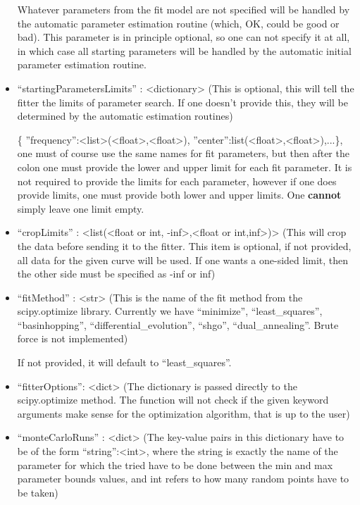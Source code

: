 \documentclass[11pt]{article} %
\begin{document}
\begin{tcolorbox}[breakable,title=Sending ``params'' to the server]
\begin{itemize}
Whatever parameters from the fit model are not specified will be handled 
by the automatic parameter estimation routine (which, OK, could be good or bad). This parameter is in principle optional, so one can not specify it at all, in which case all starting parameters will be handled by the automatic initial parameter estimation routine.

\item ``startingParametersLimits'' : <dictionary> (This is optional, this will tell the fitter the limits of parameter search. If one doesn't provide this, they will be determined by the automatic estimation routines) 

{ \{ {''}frequency{''}:<list>(<float>,<float>), {''}center{''}:list(<float>,<float>),...\}}, 
one must of course use the same names for fit parameters, but then after the colon one must provide the lower and upper limit for each fit parameter. 
It is not required to provide the limits for each parameter, however if one does provide limits, one must provide both lower and upper limits. 
One \textbf{cannot} simply leave one limit empty.

\item ``cropLimits'' : <list(<float or int, -inf>,<float or int,inf>)> (This will crop the data before sending it to the fitter. 
This item is optional, if not provided, all data for the given curve will be used.
If one wants a one-sided limit, then the other side must be specified as -inf or inf)

\item ``fitMethod'' : <str> (This is the name of the fit method from the scipy.optimize library. Currently we have ``minimize'', ``least_squares'', ``basinhopping'', ``differential_evolution'', ``shgo'', ``dual_annealing''. Brute force is not implemented)

If not provided, it will default to ``least_squares''.

\item ``fitterOptions'': <dict> (The dictionary is passed directly to the scipy.optimize method. The function will not check if the given keyword arguments make sense for the optimization algorithm, that is up to the user)

\item ``monteCarloRuns'' : <dict> (The key-value pairs in this dictionary have to be of the form ``string'':<int>, where the string is exactly the name of the parameter for which the tried have to be done between the min and max parameter bounds values, and int refers to how many random points have to be taken)


\end{itemize}
\end{tcolorbox}
\end{document}

